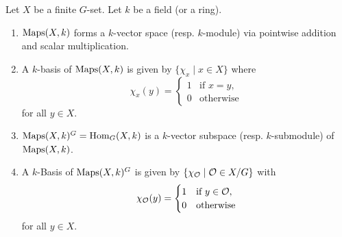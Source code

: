 \begin{lem}\label{lem: basis of Maps and Hom}
 Let $X$ be a finite $G$-set. Let $k$ be a field (or a ring).
 \begin{enumerate}[label=\emph{\alph*)},leftmargin=*]
  \item
   $\operatorname{Maps}(X,k)$ forms a $k$-vector space (resp. $k$-module) via pointwise addition and scalar multiplication.
  \item
   A $k$-basis of $\operatorname{Maps}(X,k)$ is given by $\{\chi_x \mid x \in X\}$ where
   \[
    \chi_x(y) =
    \begin{cases}
     1 & \text{if } x=y, \\
     0 & \text{otherwise}
    \end{cases}
   \]
   for all $y \in X$.
  \item
   $\operatorname{Maps}(X,k)^G = \operatorname{Hom}_G(X,k)$ is a $k$-vector subspace (resp. $k$-submodule) of $\operatorname{Maps}(X,k)$.
  \item
   A $k$-Basis of $\operatorname{Maps}(X,k)^G$ is given by $\{\chi_\mathcal{O} \mid \mathcal{O} \in X/G\}$ with
   \[
    \chi_\mathcal{O}(y) =
    \begin{cases}
     1 & \text{if } y \in \mathcal{O}, \\
     0 & \text{otherwise}
    \end{cases}
   \]
   for all $y \in X$.
 \end{enumerate}
\end{lem}
